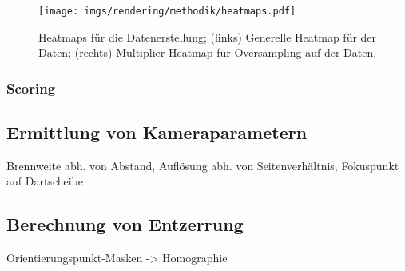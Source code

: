 \todo{}

\begin{figure}
    \centering
    \texttt{[image: imgs/rendering/methodik/heatmaps.pdf]}
    \caption{Heatmaps für die Datenerstellung; (links) Generelle Heatmap für  der Daten; (rechts) Multiplier-Heatmap für Oversampling auf  der Daten.}
    \label{img:heatmaps}
\end{figure}

\subsubsection{Scoring}

\todo{}

\subsection{Ermittlung von Kameraparametern}  %
\label{sec:ermittlung_kameraparamater}

Brennweite abh. von Abstand,
Auflösung abh. von Seitenverhältnis,
Fokuspunkt auf Dartscheibe

\todo{}

\subsection{Berechnung von Entzerrung}  %
\label{sec:berechnung_entzerrung}

Orientierungspunkt-Masken -> Homographie

\todo{}
